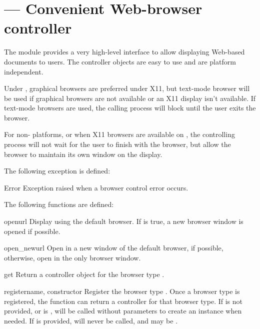 \section{ ---
         Convenient Web-browser controller}


The  module provides a very high-level interface to
allow displaying Web-based documents to users.  The controller objects
are easy to use and are platform independent.

Under \UNIX, graphical browsers are preferred under X11, but text-mode
browser will be used if graphical browsers are not available or an X11
display isn't available.  If text-mode browsers are used, the calling
process will block until the user exits the browser.

For non-\UNIX{} platforms, or when X11 browsers are available on
\UNIX, the controlling process will not wait for the user to finish
with the browser, but allow the browser to maintain its own window on
the display.

The following exception is defined:

\begin{excdesc}{Error}
  Exception raised when a browser control error occurs.
\end{excdesc}

The following functions are defined:

\begin{funcdesc}{open}{url}
  Display  using the default browser.  If  is true,
  a new browser window is opened if possible.
\end{funcdesc}

\begin{funcdesc}{open_new}{url}
  Open  in a new window of the default browser, if possible,
  otherwise, open  in the only browser window.
\end{funcdesc}

\begin{funcdesc}{get}{}
  Return a controller object for the browser type .
\end{funcdesc}

\begin{funcdesc}{register}{name, constructor}
  Register the browser type .  Once a browser type is
  registered, the  function can return a controller
  for that browser type.  If  is not provided, or is
  ,  will be called without parameters to
  create an instance when needed.  If  is provided,
   will never be called, and may be .
\end{funcdesc}

